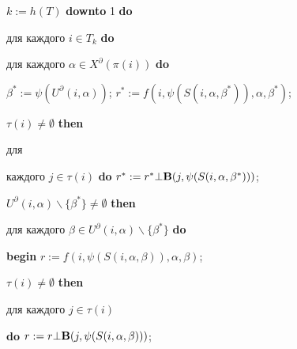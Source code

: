 \hspace{3mm}{\bf for} $k:=h(T)$ {\bf downto} 1 {\bf do}



\hspace{3mm}{\bf for}  для каждого $i\in

T_k$ {\bf do}



\hspace{3mm}{\bf for} для каждого $\alpha \in X^\partial (\pi

(i))$ {\bf do}



\hspace{3mm}{\bf begin} $\beta^\ast:=\psi (U^\partial

(i,\alpha))$; $r^\ast :=f(i,\psi (S(i,\alpha,\beta^\ast)),

       \alpha,\beta^\ast)$;



\hspace{16mm}{\bf if} $\tau (i)\ne \emptyset$ {\bf then}



\hspace{16mm}{\bf for} для

каждого $j\in \tau (i)$ {\bf do} $r^\ast :=r^\ast \bot {\bf B}(j,\psi

(S(i,\alpha,\beta^\ast)))$;



\hspace{16mm}{\bf if} $U^\partial (i,\alpha )\backslash \{\beta^

\ast \}\ne \emptyset$ {\bf then}



\hspace{16mm}{\bf  for} для каждого $\beta \in

U^\partial (i,\alpha )\backslash \{\beta^\ast\}$ {\bf do}



\hspace{16mm} {\bf begin} $r:=f(i,\psi

(S(i,\alpha,\beta)),\alpha,\beta)$;



\hspace{27mm}{\bf if} $\tau (i)\ne \emptyset$ {\bf then}



\hspace{27mm}{\bf for} для каждого $j\in \tau (i)$

{\bf do} $r:=r\bot {\bf B}(j,\psi(S(i,\alpha,\beta)))$;



